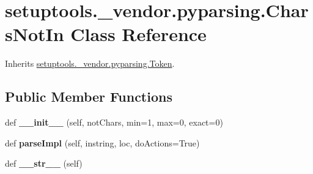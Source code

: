 \hypertarget{classsetuptools_1_1__vendor_1_1pyparsing_1_1_chars_not_in}{}\section{setuptools.\+\_\+vendor.\+pyparsing.\+Chars\+Not\+In Class Reference}
\label{classsetuptools_1_1__vendor_1_1pyparsing_1_1_chars_not_in}


Inherits \hyperlink{classsetuptools_1_1__vendor_1_1pyparsing_1_1_token}{setuptools.\+\_\+vendor.\+pyparsing.\+Token}.

\subsection*{Public Member Functions}
\begin{DoxyCompactItemize}
\item 
\mbox{\label{classsetuptools_1_1__vendor_1_1pyparsing_1_1_chars_not_in_a1aa8b49223feb8cc095a146acf54dfa8}} 
def {\bfseries \+\_\+\+\_\+init\+\_\+\+\_\+} (self, not\+Chars, min=1, max=0, exact=0)
\item 
\mbox{\label{classsetuptools_1_1__vendor_1_1pyparsing_1_1_chars_not_in_ab9d473644544bcc233f7a8646563d737}} 
def {\bfseries parse\+Impl} (self, instring, loc, do\+Actions=True)
\item 
\mbox{\label{classsetuptools_1_1__vendor_1_1pyparsing_1_1_chars_not_in_a7ca88b3e542a6abcbed449f085b0c0a4}} 
def {\bfseries \+\_\+\+\_\+str\+\_\+\+\_\+} (self)
\end{DoxyCompactItemize}
